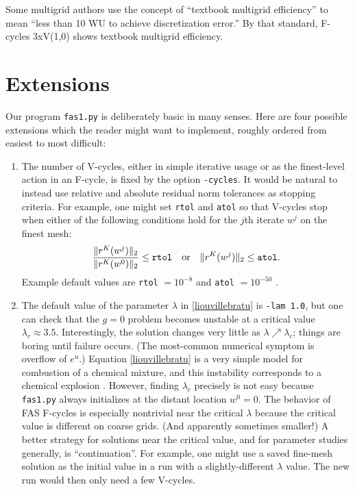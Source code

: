 \documentclass[letterpaper,final,12pt,reqno]{amsart}
\begin{document}
Some multigrid authors \cite[for example]{BrownSmithAhmadia2013} use the concept of ``textbook multigrid efficiency'' to mean ``less than 10 WU to achieve discretization error.''  By that standard, \textsf{F-cycles 3xV(1,0)} shows textbook multigrid efficiency.

\section{Extensions}  \label{sec:extensions}

Our program \texttt{fas1.py} is deliberately basic in many senses.  Here are four possible extensions which the reader might want to implement, roughly ordered from easiest to most difficult:
\renewcommand{\labelenumi}{\textbf{\Roman{enumi}.}}
\begin{enumerate}
\item The number of V-cycles, either in simple iterative usage or as the finest-level action in an F-cycle, is fixed by the option \texttt{-cycles}.  It would be natural to instead use relative and absolute residual norm tolerances as stopping criteria.  For example, one might set \texttt{rtol} and \texttt{atol} so that V-cycles stop when either of the following conditions hold for the $j$th iterate $w^j$ on the finest mesh:
    $$\frac{\|r^K(w^j)\|_2}{\|r^K(w^0)\|_2} \le \text{\texttt{rtol}} \quad \text{or} \quad \|r^K(w^j)\|_2 \le \text{\texttt{atol}}.$$
Example default values are \texttt{rtol} $=10^{-8}$ and \texttt{atol} $=10^{-50}$ \cite{Bueler2021}.
\item The default value of the parameter $\lambda$ in \eqref{liouvillebratu} is \texttt{-lam 1.0}, but one can check that the $g=0$ problem becomes unstable at a critical value $\lambda_c \approx 3.5$.  Interestingly, the solution changes very little as $\lambda \nearrow \lambda_c$; things are boring until failure occurs.  (The most-common numerical symptom is overflow of $e^u$.)  Equation \eqref{liouvillebratu} is a very simple model for combustion of a chemical mixture, and this instability corresponds to a chemical explosion \cite{FrankKameneckij1955}.  However, finding $\lambda_c$ precisely is not easy because \texttt{fas1.py} always initializes at the distant location $w^0=0$.  The behavior of FAS F-cycles is especially nontrivial near the critical $\lambda$ because the critical value is different on coarse grids.  (And apparently sometimes smaller!)  A better strategy for solutions near the critical value, and for parameter studies generally, is ``continuation''.  For example, one might use a saved fine-mesh solution as the initial value in a run with a slightly-different $\lambda$ value.  The new run would then only need a few V-cycles.

\end{enumerate}
\end{document}
